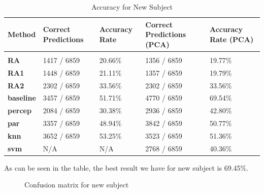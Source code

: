 \documentclass{article} %
\begin{document}
\begin{table}[H]
\caption{Accuracy for New Subject}
\begin{center}
\begin{tabular}{l||ll|ll}
{\bf Method} & {\bf Correct Predictions} & {\bf Accuracy Rate} & {\bf Correct Predictions (PCA)} & {\bf Accuracy Rate (PCA)} \\
\hline &&&& \\
{\bf RA}       & 1417 / 6859 & 20.66\% & 1356 / 6859 & 19.77\% \\
{\bf RA1}      & 1448 / 6859 & 21.11\% & 1357 / 6859 & 19.79\% \\
{\bf RA2}      & 2302 / 6859 & 33.56\% & 2302 / 6859 & 33.56\% \\
{\bf baseline} & 3457 / 6859 & 51.71\% & 4770 / 6859 & 69.54\% \\
{\bf percep}   & 2084 / 6859 & 30.38\% & 2936 / 6859 & 42.80\% \\
{\bf par}      & 3357 / 6859 & 48.94\% & 3842 / 6859 & 50.77\% \\
{\bf knn}      & 3652 / 6859 & 53.25\% & 3523 / 6859 & 51.36\% \\
{\bf svm}      &     N/A     &     N/A & 2768 / 6859 & 40.36\% \\
\end{tabular}
\end{center}
\end{table}

As can be seen in the table, the best result we have for new subject is 69.45\%.

\begin{figure}[hbt]
\begin{center}
\end{center}
\caption{Confusion matrix for new subject}
\end{figure}
\end{document}
